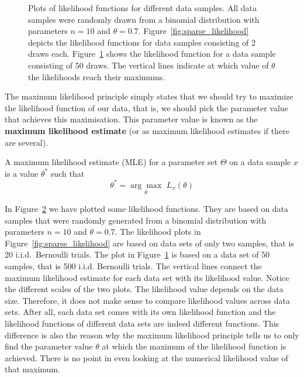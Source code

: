 \begin{figure}
\begin{subfigure}{\textwidth}
\caption{}
\label{fig:dense_likelihood} 
\end{subfigure}
\caption{Plots of likelihood functions for different data samples. All data samples were randomly drawn
from a binomial distribution with parameters $ n=10 $ and $ \theta=0.7 $. Figure~\ref{fig:sparse_likelihood}
depicts the likelihood functions for data samples consisting of 2 draws each. 
Figure~\ref{fig:dense_likelihood}
shows the likelihood function for a data sample consisting of 50 draws. The vertical lines indicate
at which value of $ \theta $ the likelihoods reach their maximums.}
\label{fig:likelihood_plots}
\end{figure}

The maximum likelihood principle simply states that we should try to maximize the likelihood function of
our data, that is, we should pick the parameter value that achieves this maximisation. This parameter value
is known as the \textbf{maximum likelihood estimate} (or as maximum likelihood estimates if there are several). 

\begin{Definition}
A maximum likelihood estimate (MLE) for a parameter set $ \Theta $  on a data sample $ x $ 
is a value $ \theta^{*} $ such that
$$ \theta^{*} = \underset{\theta}{\arg\max}\, \, L_{x}(\theta) $$
\end{Definition}

In Figure~\ref{fig:likelihood_plots} we have plotted some likelihood functions. They are based on data
samples that were randomly generated from a binomial distribution with parameters $ n=10 $ and 
$ \theta=0.7 $. The likelihood plots in Figure~\ref{fig:sparse_likelihood} are based on data sets of only
two samples, that is 20 i.i.d.\ Bernoulli trials. The plot in Figure~\ref{fig:dense_likelihood} is based on a 
data set of 50 samples, that is 500 i.i.d. Bernoulli trials. 
The vertical lines connect the maximum likelihood estimate
for each data set with its likelihood value. Notice the different scales of the two plots. The likelihood value depends on the
data size. Therefore, it does not make sense to compare likelihood values across data sets. After all, each data set comes with its own
likelihood function and the likelihood functions of different data sets are indeed different functions. This difference is also the
reason why the maximum likelihood principle tells us to only find the parameter value $ \theta $ at which the maximum of the
likelihood function is achieved. There is no point in even looking at the numerical likelihood value of that maximum.

